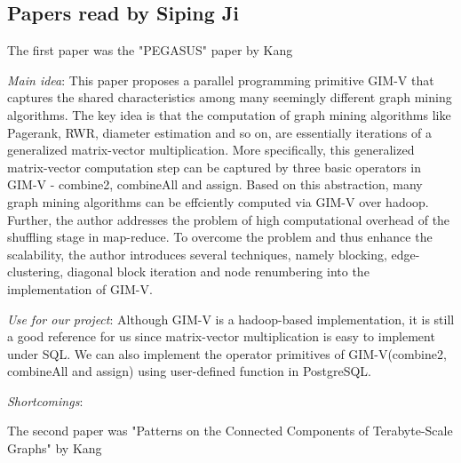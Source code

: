 \subsection{Papers read by Siping Ji}
The first paper was the "PEGASUS" paper by Kang
\cite{Kang09}
\begin{itemize*}
\item {\em Main idea}: 
		This paper proposes a parallel programming primitive GIM-V that captures the shared characteristics among many seemingly different graph mining algorithms. The key idea is that the computation of graph mining algorithms like Pagerank, RWR, diameter estimation and so on, are essentially iterations of a generalized matrix-vector multiplication. More specifically, this generalized matrix-vector computation step can be captured by three basic operators in GIM-V - combine2, combineAll and assign. Based on this abstraction, many graph mining algorithms can be effciently computed via GIM-V over hadoop. Further, the author addresses the problem of high computational overhead of the shuffling stage in map-reduce. To overcome the problem and thus enhance the scalability, the author introduces several techniques, namely blocking, edge-clustering, diagonal block iteration and node renumbering into the implementation of GIM-V.
\item {\em Use for our project}:
      Although GIM-V is a hadoop-based implementation, it is still a good reference for us since matrix-vector multiplication is easy to implement under SQL.  We can also implement the operator primitives of GIM-V(combine2, combineAll and assign) using user-defined function in PostgreSQL.

\item {\em Shortcomings}:
      
\end{itemize*}
The second paper was "Patterns on the Connected Components of Terabyte-Scale Graphs" by Kang
\cite{DBLP:conf/icdm/KangMAF10}
